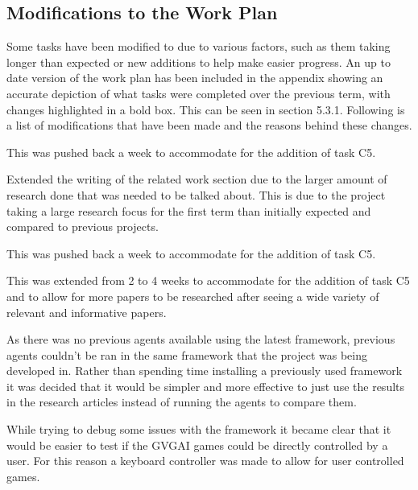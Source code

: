 \documentclass[a4paper]{article}
\begin{document}
\subsection{Modifications to the Work Plan}
Some tasks have been modified to due to various factors, such as them taking longer than expected or new additions to help make easier progress.
An up to date version of the work plan has been included in the appendix showing an accurate depiction of what tasks were completed over the previous term, with changes highlighted in a bold box.
This can be seen in section 5.3.1.
Following is a list of modifications that have been made and the reasons behind these changes.
\begin{description}
\setlength{\itemsep}{0pt}
\setlength{\parskip}{0pt}
\item [\large{Documentation}]
\item [D4--Interim Report Outline Sections]
This was pushed back a week to accommodate for the addition of task C5.
\item [D5--Interim Report Related Work]
Extended the writing of the related work section due to the larger amount of research done that was needed to be talked about.
This is due to the project taking a large research focus for the first term than initially expected and compared to previous projects.
\item [D6--Interim Report Draft]
This was pushed back a week to accommodate for the addition of task C5.
\end{description}

\begin{description}
\setlength{\itemsep}{0pt}
\setlength{\parskip}{0pt}
\item [\large{Research}]
\item [R5--Other Related Works]
This was extended from 2 to 4 weeks to accommodate for the addition of task C5 and to allow for more papers to be researched after seeing a wide variety of relevant and informative papers.
\end{description}

\begin{description}
\setlength{\itemsep}{0pt}
\setlength{\parskip}{0pt}
\item [\large{Development}]
\item [S3--Run available previous agents]
As there was no previous agents available using the latest framework, previous agents couldn't be ran in the same framework that the project was being developed in.
Rather than spending time installing a previously used framework it was decided that it would be simpler and more effective to just use the results in the research articles instead of running the agents to compare them.
\item [S5--Develop Keyboard Controller]
While trying to debug some issues with the framework it became clear that it would be easier to test if the GVGAI games could be directly controlled by a user.
For this reason a keyboard controller was made to allow for user controlled games.
\end{description}
\end{document}
